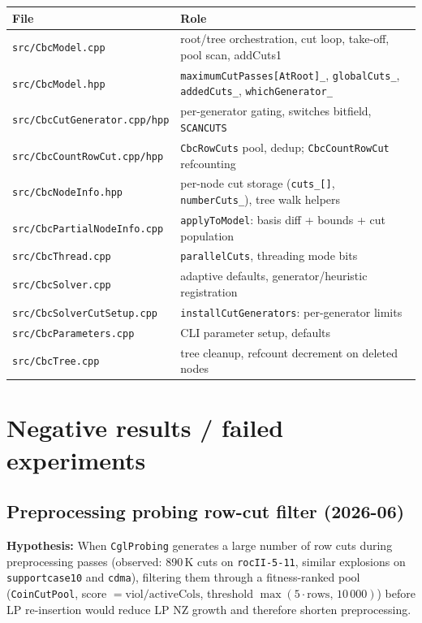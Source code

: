 \documentclass[11pt,a4paper]{article}
\begin{document}
\begin{tabular}{ll}
\toprule
File & Role\\
\midrule
\texttt{src/CbcModel.cpp}             & root/tree orchestration, cut loop, take-off, pool scan,
                                         addCuts1\\
\texttt{src/CbcModel.hpp}             & \texttt{maximumCutPasses[AtRoot]\_}, \texttt{globalCuts\_},
                                         \texttt{addedCuts\_}, \texttt{whichGenerator\_}\\
\texttt{src/CbcCutGenerator.cpp/hpp}  & per-generator gating, switches bitfield,
                                         \texttt{SCANCUTS}\\
\texttt{src/CbcCountRowCut.cpp/hpp}   & \texttt{CbcRowCuts} pool, dedup; \texttt{CbcCountRowCut}
                                         refcounting\\
\texttt{src/CbcNodeInfo.hpp}           & per-node cut storage (\texttt{cuts\_[]}, \texttt{numberCuts\_}),
                                         tree walk helpers\\
\texttt{src/CbcPartialNodeInfo.cpp}    & \texttt{applyToModel}: basis diff + bounds +
                                         cut population\\
\texttt{src/CbcThread.cpp}            & \texttt{parallelCuts}, threading mode bits\\
\texttt{src/CbcSolver.cpp}            & adaptive defaults, generator/heuristic registration\\
\texttt{src/CbcSolverCutSetup.cpp}    & \texttt{installCutGenerators}: per-generator limits\\
\texttt{src/CbcParameters.cpp}        & CLI parameter setup, defaults\\
\texttt{src/CbcTree.cpp}              & tree cleanup, refcount decrement on deleted nodes\\
\bottomrule
\end{tabular}

\section*{Negative results / failed experiments}

\subsection*{Preprocessing probing row-cut filter (2026-06)}

\textbf{Hypothesis:} When \texttt{CglProbing} generates a large number of row cuts during
preprocessing passes (observed: 890\,K cuts on \texttt{rocII-5-11}, similar explosions on
\texttt{supportcase10} and \texttt{cdma}), filtering them through a fitness-ranked pool
(\texttt{CoinCutPool}, score $= \mathrm{viol}/\mathrm{activeCols}$, threshold
$\max(5\!\cdot\!\mathrm{rows},\,10\,000)$) before LP re-insertion would reduce LP NZ growth
and therefore shorten preprocessing.
\end{document}
